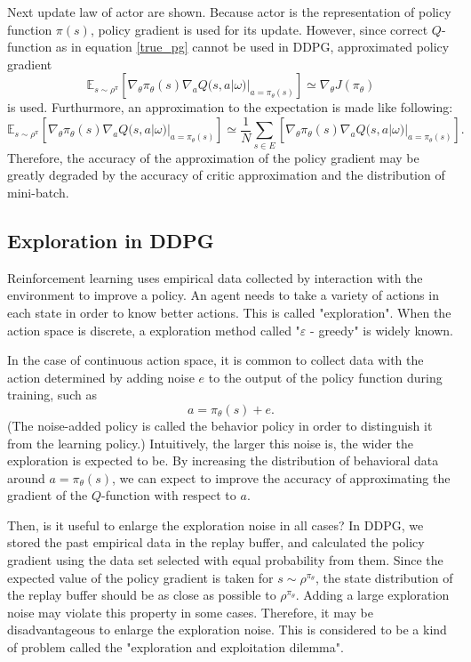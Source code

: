 \documentclass[english, dvipdfmx]{ampmt}             %
\newcommand{\expect}{\mathbb{E}}
\begin{document}
Next update law of actor are shown. Because actor is the representation of policy function $\pi(s)$, policy gradient is used for its update. However, since correct $Q$-function as in equation \eqref{true_pg} cannot be used in DDPG, approximated policy gradient
\begin{equation}
	\expect_{s\sim\rho^{\pi}}[\nabla_{\theta}\pi_{\theta}(s)\nabla_{a}Q(s, a|\omega)|_{a=\pi_{\theta}(s)}] \simeq \nabla_{\theta}J(\pi_{\theta}) 
\end{equation}
 is used. Furthurmore, an approximation to the expectation is made like following:
 \begin{equation}
	\expect_{s\sim\rho^{\pi}}[\nabla_{\theta}\pi_{\theta}(s)\nabla_{a}Q(s, a|\omega)|_{a=\pi_{\theta}(s)}] \simeq \frac{1}{N}\sum_{s\in E}[\nabla_{\theta}\pi_{\theta}(s)\nabla_{a}Q(s, a|\omega)|_{a=\pi_{\theta}(s)}]. \label{expectation_approximation}
\end{equation}
Therefore, the accuracy of the approximation of the policy gradient may be greatly degraded by the accuracy of critic approximation and the distribution of mini-batch.

\subsection{Exploration in DDPG}
\label{sec:exploration}
Reinforcement learning uses empirical data collected by interaction with the environment to improve a policy. An agent needs to take a variety of actions in each state in order to know better actions. This is called "exploration". When the action space is discrete, a exploration method called "$\varepsilon$ - greedy" is widely known. \par
In the case of continuous action space, it is common to collect data with the action determined by adding noise $e$ to the output of the policy function during training, such as
\begin{equation}
	a = \pi_{\theta}(s) + e.
\end{equation}
(The noise-added policy is called the behavior policy in order to distinguish it from the learning policy.) Intuitively, the larger this noise is, the wider the exploration is expected to be. By increasing the distribution of behavioral data around $a=\pi_{\theta}(s)$, we can expect to improve the accuracy of approximating the gradient of the $Q$-function with respect to $a$. \par
Then, is it useful to enlarge the exploration noise in all cases? In DDPG, we stored the past empirical data in the replay buffer, and calculated the policy gradient using the data set selected with equal probability from them. Since the expected value of the policy gradient is taken for $s\sim\rho^{\pi_{\theta}}$, the state distribution of the replay buffer should be as close as possible to $\rho^{\pi_{\theta}}$. Adding a large exploration noise may violate this property in some cases. Therefore, it may be disadvantageous to enlarge the exploration noise. This is considered to be a kind of problem called the "exploration and exploitation dilemma".
\end{document}
